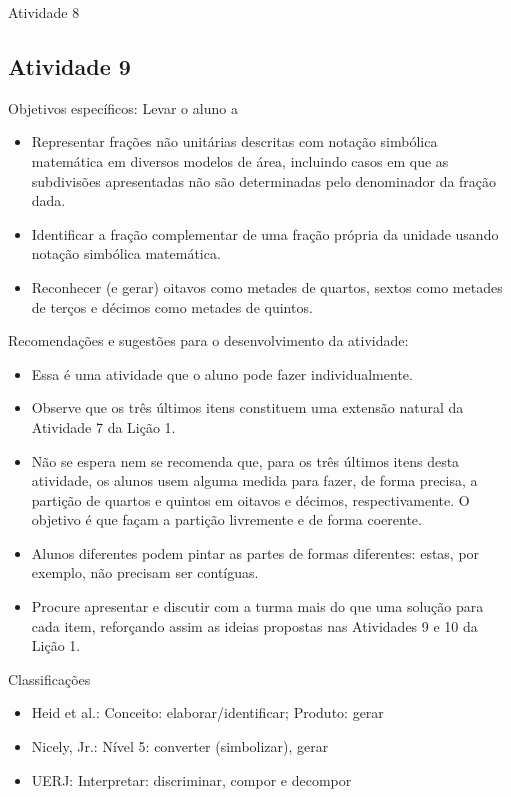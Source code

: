 \documentclass[oneside]{book}
\begin{document}
\begin{multicols}{2}
\begin{resposta*}{Atividade 8}
\end{resposta*}




\subsection{Atividade 9}



  Objetivos específicos: Levar o aluno a
\begin{itemize} %
    \item       Representar frações não unitárias descritas com notação simbólica matemática em diversos modelos de área, incluindo casos em que as subdivisões apresentadas não são determinadas pelo denominador da fração dada.
    \item       Identificar a fração complementar de uma fração própria da unidade usando notação simbólica matemática.
    \item       Reconhecer (e gerar) oitavos como metades de quartos, sextos como metades de terços e décimos como metades de quintos.
\end{itemize} %


  Recomendações e sugestões para o desenvolvimento da atividade:
\begin{itemize} %
    \item       Essa é uma atividade que o aluno pode fazer individualmente.
    \item       Observe que os três últimos itens constituem uma extensão natural da Atividade 7 da Lição 1.
    \item       Não se espera nem se recomenda que, para os três últimos itens desta atividade, os alunos usem alguma medida para fazer, de forma precisa, a partição de quartos e quintos em oitavos e décimos, respectivamente. O objetivo é que façam a partição livremente e de forma coerente.
    \item       Alunos diferentes podem pintar as partes de formas diferentes: estas, por exemplo, não precisam ser contíguas.
    \item       Procure apresentar e discutir com a turma mais do que uma solução para cada item, reforçando assim as ideias propostas nas Atividades 9 e 10 da Lição 1.
\end{itemize} %


  Classificações
\begin{itemize} %
    \item       Heid et al.: Conceito: elaborar/identificar; Produto: gerar
    \item       Nicely, Jr.: Nível 5: converter (simbolizar), gerar
    \item       UERJ: Interpretar: discriminar, compor e decompor
\end{itemize} %



\end{multicols}
\end{document}
